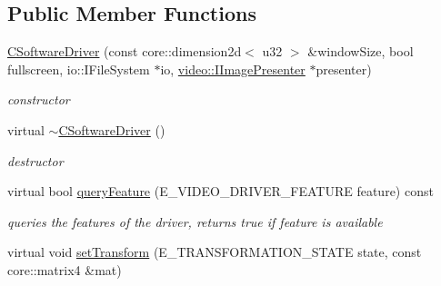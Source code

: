 \subsection*{Public Member Functions}
\begin{DoxyCompactItemize}
\item 
\hypertarget{classirr_1_1video_1_1_c_software_driver_aff8f7e0f80d82b59f03dab65bd12ce0c}{\hyperlink{classirr_1_1video_1_1_c_software_driver_aff8f7e0f80d82b59f03dab65bd12ce0c}{C\-Software\-Driver} (const core\-::dimension2d$<$ u32 $>$ \&window\-Size, bool fullscreen, io\-::\-I\-File\-System $\ast$io, \hyperlink{classirr_1_1video_1_1_i_image_presenter}{video\-::\-I\-Image\-Presenter} $\ast$presenter)}\label{classirr_1_1video_1_1_c_software_driver_aff8f7e0f80d82b59f03dab65bd12ce0c}

\begin{DoxyCompactList}\small\item\em constructor \end{DoxyCompactList}\item 
\hypertarget{classirr_1_1video_1_1_c_software_driver_ac4250bc3c50302cecabf4dcd5544cc3b}{virtual \hyperlink{classirr_1_1video_1_1_c_software_driver_ac4250bc3c50302cecabf4dcd5544cc3b}{$\sim$\-C\-Software\-Driver} ()}\label{classirr_1_1video_1_1_c_software_driver_ac4250bc3c50302cecabf4dcd5544cc3b}

\begin{DoxyCompactList}\small\item\em destructor \end{DoxyCompactList}\item 
\hypertarget{classirr_1_1video_1_1_c_software_driver_a26b827fccbd65e86293575e50c4307f2}{virtual bool \hyperlink{classirr_1_1video_1_1_c_software_driver_a26b827fccbd65e86293575e50c4307f2}{query\-Feature} (E\-\_\-\-V\-I\-D\-E\-O\-\_\-\-D\-R\-I\-V\-E\-R\-\_\-\-F\-E\-A\-T\-U\-R\-E feature) const }\label{classirr_1_1video_1_1_c_software_driver_a26b827fccbd65e86293575e50c4307f2}

\begin{DoxyCompactList}\small\item\em queries the features of the driver, returns true if feature is available \end{DoxyCompactList}\item 
\hypertarget{classirr_1_1video_1_1_c_software_driver_a1a752a52b558591139fd6a5527a9eee5}{virtual void \hyperlink{classirr_1_1video_1_1_c_software_driver_a1a752a52b558591139fd6a5527a9eee5}{set\-Transform} (E\-\_\-\-T\-R\-A\-N\-S\-F\-O\-R\-M\-A\-T\-I\-O\-N\-\_\-\-S\-T\-A\-T\-E state, const core\-::matrix4 \&mat)}\label{classirr_1_1video_1_1_c_software_driver_a1a752a52b558591139fd6a5527a9eee5}


\end{DoxyCompactItemize}
